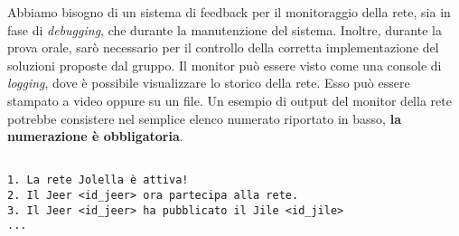 Abbiamo bisogno di un sistema di feedback per il monitoraggio della rete, sia in
fase di \textit{debugging}, che durante la manutenzione del sistema. Inoltre,
durante la prova orale, sarò necessario per il controllo della corretta
implementazione del soluzioni proposte dal gruppo. Il monitor può essere visto
come una console di \textit{logging}, dove è possibile visualizzare lo storico
della rete. Esso può essere stampato a video oppure su un file. Un esempio di
output del monitor della rete potrebbe consistere nel semplice elenco numerato
riportato in basso, \textbf{la numerazione è obbligatoria}.

\begin{verbatim}

1. La rete Jolella è attiva!
2. Il Jeer <id_jeer> ora partecipa alla rete.
3. Il Jeer <id_jeer> ha pubblicato il Jile <id_jile>
...

\end{verbatim}
